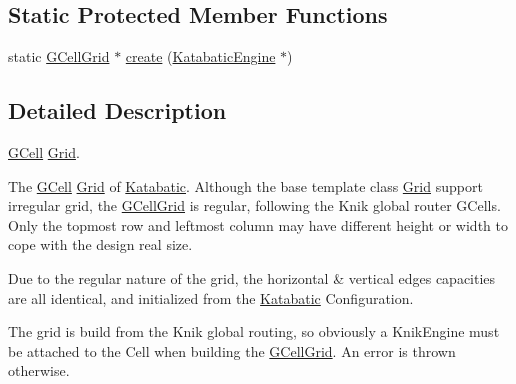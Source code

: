 \subsection*{Static Protected Member Functions}
\begin{DoxyCompactItemize}
\item 
static \hyperlink{classKatabatic_1_1GCellGrid}{G\-Cell\-Grid} $\ast$ \hyperlink{classKatabatic_1_1GCellGrid_a19a45b2e6c6b9ca8898b2fde035d1827}{create} (\hyperlink{classKatabatic_1_1KatabaticEngine}{Katabatic\-Engine} $\ast$)
\end{DoxyCompactItemize}


\subsection{Detailed Description}
\hyperlink{classKatabatic_1_1GCell}{G\-Cell} \hyperlink{classKatabatic_1_1Grid}{Grid}. 

The \hyperlink{classKatabatic_1_1GCell}{G\-Cell} \hyperlink{classKatabatic_1_1Grid}{Grid} of \hyperlink{namespaceKatabatic}{Katabatic}. Although the base template class \hyperlink{classKatabatic_1_1Grid}{Grid} support irregular grid, the \hyperlink{classKatabatic_1_1GCellGrid}{G\-Cell\-Grid} is regular, following the Knik global router G\-Cells. Only the topmost row and leftmost column may have different height or width to cope with the design real size.

Due to the regular nature of the grid, the horizontal \& vertical edges capacities are all identical, and initialized from the \hyperlink{namespaceKatabatic}{Katabatic} Configuration.

The grid is build from the Knik global routing, so obviously a Knik\-Engine must be attached to the Cell when building the \hyperlink{classKatabatic_1_1GCellGrid}{G\-Cell\-Grid}. An error is thrown otherwise. 

